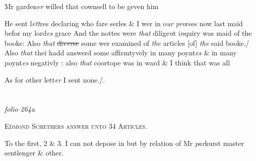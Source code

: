 \documentclass[12pt, a4paper]{book}
\begin{document}
				\marginpar[\vspace{0.5cm}{\textcolor{Gray}{[29]}}]{}
			
 	
		\ifthenelse{\isodd{\thepage}}
		{\reversemarginpar}
		{\normalmarginpar}
		Mr garden\textit{er} willed that cownsell to be geven him

				\marginpar[\vspace{0.5cm}{\textcolor{Gray}{[30]}}]{}
			
	
		\ifthenelse{\isodd{\thepage}}
		{\reversemarginpar}
		{\normalmarginpar}
		He sent l\textit{ett}res declaring who fare serles \& I wer in o\textit{ur pro}rses now last
maid befor my lord\textit{es} grace  And the nottes were \textit{that} dilige\textit{n}t i\textit{n}quiry was
maid of the booke: Also \textit{that}
               \sout{div\textit{er}se }some wer examined of \textit{the} articles
[of] \textit{the} said booke./ Also \textit{that} thei hadd answerd some affirmtyvely in many
poynt\textit{es} \& in many poynt\textit{es} negativly : also \textit{that} coortope was in ward \& I think that was all

 	
				\marginpar[\vspace{0.5cm}{\textcolor{Gray}{31}}]{}
			

		\ifthenelse{\isodd{\thepage}}
		{\reversemarginpar}
		{\normalmarginpar}
		 As for other lett\textit{er} I sent none./.

\dotfill
						\newpage {} \section*{}  \subsection*{}

\textit{folio 264a}




				\begin{center} \begin{large} {\scshape Edmond Schethers answer unto 34 Articles.} \end{large} \end{center}
			
            		
				\marginpar[\vspace{0.5cm}{\textcolor{Gray}{1.2.3.}}]{}
			 
		\ifthenelse{\isodd{\thepage}}
		{\reversemarginpar}
		{\normalmarginpar}
		To the first, 2 \& 3. I can not depose in but by relation of Mr \textit{par}kurst
master sentlenger \& other.
			
\end{document}
